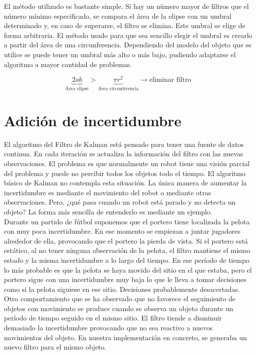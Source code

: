 El método utilizado es bastante simple. Si hay un número mayor de filtros que el número mínimo especificado, se compara el área de la elipse con un umbral determinado y, en caso de superarse, el filtro se elimina. Este umbral se elige de forma arbitraria. El método usado para que sea sencillo elegir el umbral es crearlo a partir del área de una circunferencia. Dependiendo del modelo del objeto que se utilice se puede tener un umbral más alto o más bajo, pudiendo adaptarse el algoritmo a mayor cantidad de problemas.

\begin{equation}
  \underbrace{2ab}_{\text{Área elipse}} > \underbrace{\pi r^2}_{\text{Área circunferencia}} \rightarrow \text{eliminar filtro}
\end{equation}

\section{Adición de incertidumbre}
\label{sec:adicionincertidumbre}

El algoritmo del Filtro de Kalman está pensado para tener una fuente de datos continua. En cada iteración se actualiza la información del filtro con las nuevas observaciones. El problema es que normalmente un robot tiene una visión parcial del problema y puede no percibir todos los objetos todo el tiempo. El algoritmo básico de Kalman no contempla esta situación. La única manera de aumentar la incertidumbre es mediante el movimiento del robot o mediante otras observaciones. Pero, ¿qué pasa cuando un robot está parado y no detecta un objeto? La forma más sencilla de entenderlo es mediante un ejemplo. \\

Durante un partido de fútbol suponemos que el portero tiene localizada la pelota con muy poca incertidumbre. En ese momento se empiezan a juntar jugadores alrededor de ella, provocando que el portero la pierda de vista. Si el portero está estático, al no tener ninguna observación de la pelota, el filtro mantiene el mismo estado y la misma incertidumbre a lo largo del tiempo. En ese período de tiempo lo más probable es que la pelota se haya movido del sitio en el que estaba, pero el portero sigue con una incertidumbre muy baja lo que le lleva a tomar decisiones como si la pelota siguiese en ese sitio. Decisiones probablemente desacertadas. \\

Otro comportamiento que se ha observado que no favorece el seguimiento de objetos con movimiento se produce cuando se observa un objeto durante un período de tiempo seguido en el mismo sitio. El filtro tiende a disminuir demasiado la incertidumbre provocando que no sea reactivo a nuevos movimientos del objeto. En nuestra implementación en concreto, se generaba un nuevo filtro para el mismo objeto. \\

